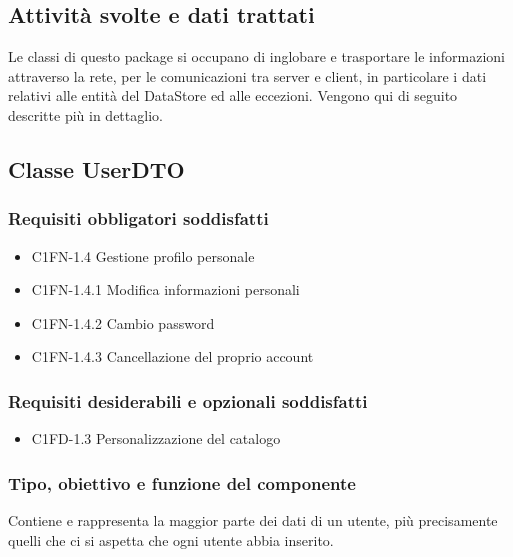 \subsection*{Attivit\`a svolte e dati trattati}
Le classi di questo package si occupano di inglobare e trasportare
le informazioni attraverso la rete, per le comunicazioni tra server e client,
in particolare i dati relativi alle entit\`a del DataStore ed alle eccezioni.
Vengono qui di seguito descritte pi\`u in dettaglio.

\subsection{Classe UserDTO}
\subsubsection*{Requisiti obbligatori soddisfatti}
\begin{itemize}
	\item C1FN-1.4 Gestione profilo personale
	\item C1FN-1.4.1 Modifica informazioni personali
	\item C1FN-1.4.2 Cambio password
	\item C1FN-1.4.3 Cancellazione del proprio account
\end{itemize}
\subsubsection*{Requisiti desiderabili e opzionali soddisfatti}
\begin{itemize}
    \item C1FD-1.3 Personalizzazione del catalogo
\end{itemize}
\subsubsection*{Tipo, obiettivo e funzione del componente}
Contiene e rappresenta la maggior parte dei dati di un utente, pi\`u
precisamente quelli che ci si aspetta che ogni utente abbia inserito.
